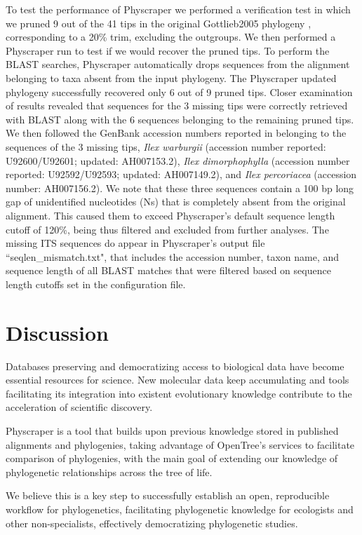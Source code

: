 \documentclass{bmcart}
\begin{document}
To test the performance of Physcraper we performed a verification test in which
we pruned 9 out of the 41 tips in the original Gottlieb2005 phylogeny \cite{gottlieb2005molecular},
corresponding to a 20\% trim, excluding the outgroups. We then performed a Physcraper
run to test if we would recover the pruned tips. To perform the BLAST searches,
Physcraper automatically drops sequences from the alignment belonging to taxa
absent from the input phylogeny.
The Physcraper updated phylogeny successfully recovered only 6 out of 9 pruned tips.
Closer examination of results revealed that sequences for the 3 missing tips were correctly retrieved
with BLAST along with the 6 sequences belonging to the remaining pruned tips.
We then followed the GenBank accession numbers reported in \cite{gottlieb2005molecular}
belonging to the sequences of the 3 missing tips, \textit{Ilex warburgii} (accession
number reported: U92600/U92601; updated: AH007153.2), \textit{Ilex dimorphophylla}
(accession number reported: U92592/U92593; updated: AH007149.2),
and \textit{Ilex percoriacea} (accession number: AH007156.2). We note that these three sequences
contain a 100 bp long gap of unidentified nucleotides (Ns) that is completely absent
from the original alignment. This caused them to exceed Physcraper's default sequence
length cutoff of 120\%, being thus filtered and excluded from further analyses.
The missing ITS sequences do appear in Physcraper's output file ``seqlen\_mismatch.txt",
that includes the accession number, taxon name, and sequence length of all BLAST matches
that were filtered based on sequence length cutoffs set in the configuration file.


\section*{Discussion}
Databases preserving and democratizing access to biological data
have become essential resources for science.
New molecular data keep accumulating and tools facilitating its integration into
existent evolutionary knowledge contribute to the acceleration of scientific discovery.

Physcraper is a tool that builds upon previous knowledge stored in published
alignments and phylogenies, taking advantage of OpenTree's services to facilitate comparison
of phylogenies, with the main goal of extending our knowledge of phylogenetic relationships
across the tree of life.

We believe this is a key step to successfully establish an open, reproducible workflow for phylogenetics,
facilitating phylogenetic knowledge for ecologists and other non-specialists, effectively
democratizing phylogenetic studies.
\end{document}
